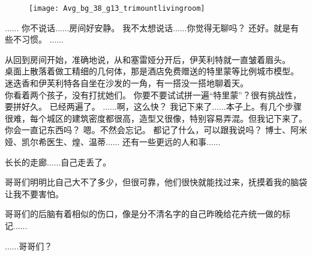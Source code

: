 \documentclass[openany]{book}
\begin{document}
\begin{figure}[h]
    \centering
    \texttt{[image: Avg\_bg\_38\_g13\_trimountlivingroom]}
\end{figure}
\begin{dialogue}
     ......
     你不说话......房间好安静。
     我不太想说话......你觉得无聊吗？
     还好。就是有些不习惯。
     ......\par
    从回到房间开始，准确地说，从和塞雷娅分开后，伊芙利特就一直皱着眉头。\\
    桌面上散落着做工精细的几何体，那是酒店免费赠送的特里蒙等比例城市模型。\\
    迷迭香和伊芙利特各自坐在沙发的一角，有一搭没一搭地聊着天。\\
    你看着两个孩子，没有打扰她们。
     你要不要试试拼一遍“特里蒙”？很有挑战性，要拼好久。
     已经两遍了。
     ......啊，这么快？
     我记下来了......本子上。有几个步骤很难，每个城区的建筑密度都很高，造型又很像，特别容易弄混。但我记下来了。
     你会一直记东西吗？
     嗯。不然会忘记。
     都记了什么，可以跟我说吗？
     博士、阿米娅、凯尔希医生、煌、温蒂......
     还有一些更远的人和事......
\end{dialogue}

{
长长的走廊......自己走丢了。\par
哥哥们明明比自己大不了多少，但很可靠，他们很快就能找过来，抚摸着我的脑袋让我不要害怕。\par
哥哥们的后脑有着相似的伤口，像是分不清名字的自己昨晚给花卉统一做的标记......\par
......哥哥们？
}
\end{document}
